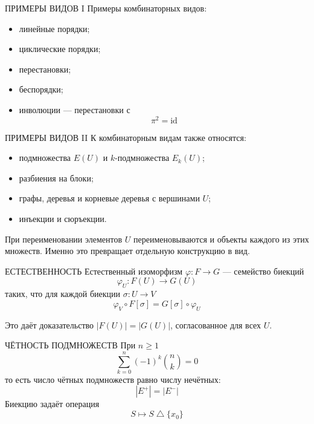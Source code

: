 \documentclass[aspectratio=169,11pt]{beamer}
\begin{document}
\begin{ctrightframe}[illustration=33]{ПРИМЕРЫ ВИДОВ I}{%
}
Примеры комбинаторных видов:
\begin{itemize}
  \item линейные порядки;
  \item циклические порядки;
  \item перестановки;
  \item беспорядки;
  \item инволюции — перестановки с
    \[
      \pi^2=\mathrm{id}
    \]
\end{itemize}
\end{ctrightframe}

\begin{cttextframe}{ПРИМЕРЫ ВИДОВ II}
К комбинаторным видам также относятся:
\begin{itemize}
  \item подмножества $E(U)$ и $k$-подмножества $E_k(U)$;
  \item разбиения на блоки;
  \item графы, деревья и корневые деревья с вершинами $U$;
  \item инъекции и сюръекции.
\end{itemize}

При переименовании элементов $U$ переименовываются и объекты каждого
из этих множеств. Именно это превращает отдельную конструкцию в вид.
\end{cttextframe}

\begin{ctrightframe}[illustration=35]{ЕСТЕСТВЕННОСТЬ}{%
}
Естественный изоморфизм $\varphi\colon F\to G$ — семейство биекций
\[
  \varphi_U\colon F(U)\longrightarrow G(U)
\]
таких, что для каждой биекции $\sigma\colon U\to V$
\[
  \varphi_V\circ F[\sigma]
  =G[\sigma]\circ\varphi_U
\]

Это даёт доказательство $|F(U)|=|G(U)|$, согласованное для всех $U$.
\end{ctrightframe}

\begin{ctbottomframe}[illustration=37]{ЧЁТНОСТЬ ПОДМНОЖЕСТВ}{%
}
\small
При $n\ge1$
\[
  \sum_{k=0}^{n}(-1)^k\binom nk=0
\]
то есть число чётных подмножеств равно числу нечётных:
\[
  |E^+|=|E^-|
\]
Биекцию задаёт операция
\[
  S\longmapsto S\mathbin{\triangle}\{x_0\}
\]
\end{ctbottomframe}
\end{document}
